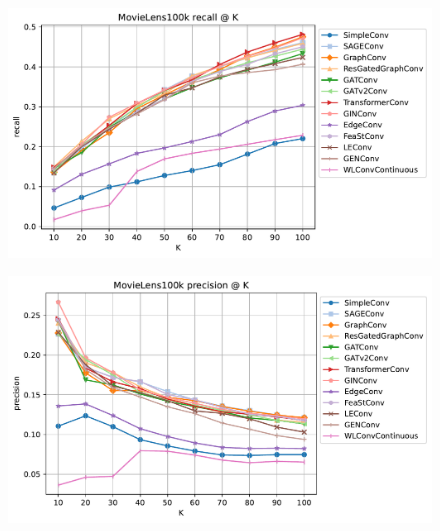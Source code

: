 \documentclass[bst/sn-nature]{sn-jnl}
\begin{document}
\begin{multicols}{2}
\begin{figure}
\begin{center}
\begin{minipage}[b]{0.48\textwidth}
    \centering
    \includegraphics[width=\textwidth]{imgs/MovieLens100k_recall.pdf}
    \label{fig:recall}
\end{minipage}
\hfill
\begin{minipage}[b]{0.48\textwidth}
    \centering
    \includegraphics[width=\textwidth]{imgs/MovieLens100k_precision.pdf}
    \label{fig:precision}
\end{minipage}


\end{center}
\end{figure}
\end{multicols}
\end{document}

